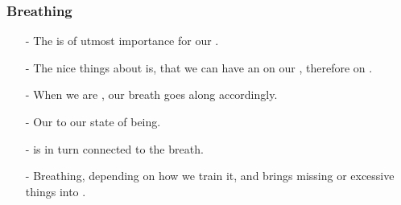 \begin{frame}
\frametitle{Breathing}

\begin{itemize}
\item[-] The  is of utmost importance for our .
\item[-] The nice things about is, that we can have an  on our , therefore on .
\item[-] When we are , our breath goes along accordingly.
\item[-] Our  to our state of being.
\item[-]  is in turn connected to the breath.
  \item[-] Breathing, depending on how we train it,  and brings  missing or excessive things into .
  \end{itemize}
\end{frame}

